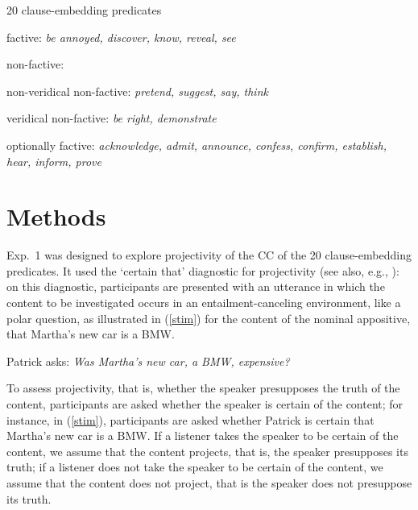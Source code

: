 \documentclass[11pt,fleqn]{article}
\newcommand{\6}{\mbox{$[\hspace*{-.6mm}[$}}
\newcommand{\9}{\mbox{$]\hspace*{-.6mm}]$}}
\begin{document}
\begin{exe}
\ex\label{pred} 20 clause-embedding predicates 

\begin{xlist}

\ex factive: {\em be annoyed, discover, know, reveal, see}

\ex non-factive:

\begin{xlist}

\ex non-veridical non-factive: {\em pretend, suggest, say, think}

\ex veridical non-factive: {\em be right, demonstrate}

\end{xlist}

\ex optionally factive: {\em acknowledge, admit, announce, confess, confirm, establish, hear, inform, prove}

\end{xlist}

\end{exe}

\section{Methods}\label{s2}

Exp.~1 was designed to explore projectivity of the CC of the 20 clause-embedding predicates. It used the `certain that' diagnostic for projectivity (see also, e.g., \citealt{tonhauser-salt26,djaerv-bacovcin-salt27,stevens-etal2017,tbd-variability,mahler-nels,demarneffe-etal-sub23}): on this diagnostic, participants are presented with an utterance in which the content to be investigated occurs in an entailment-canceling environment, like a polar question, as illustrated in (\ref{stim}) for the content of the nominal appositive, that Martha's new car is a BMW.

\begin{exe}

\ex\label{stim} Patrick asks: {\em Was Martha's new car, a BMW, expensive?} 

\end{exe}
To assess projectivity, that is, whether the speaker presupposes the truth of the content, participants are asked whether the speaker is certain of the content; for instance, in (\ref{stim}), participants are asked whether Patrick is certain that Martha's new car is a BMW. If a listener takes the speaker to be certain of the content, we assume that the content projects, that is, the speaker presupposes its truth; if a listener does not take the speaker to be certain of the content, we assume that the content does not project, that is the speaker does not presuppose its truth.
\end{document}

